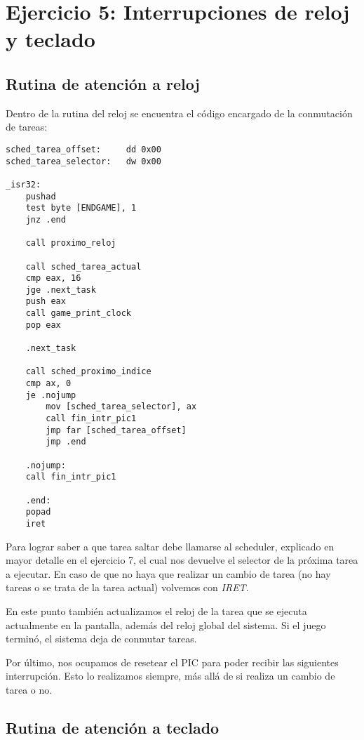 \section{Ejercicio 5: Interrupciones de reloj y teclado}

	\subsection{Rutina de atención a reloj}

	Dentro de la rutina del reloj se encuentra el código encargado de la conmutación de tareas:

    \lstset{escapechar=@,style=asm}
	\begin{lstlisting}
sched_tarea_offset:     dd 0x00
sched_tarea_selector:   dw 0x00

_isr32:
    pushad
    test byte [ENDGAME], 1
    jnz .end

    call proximo_reloj

    call sched_tarea_actual
    cmp eax, 16 
    jge .next_task
    push eax
    call game_print_clock
    pop eax

    .next_task

    call sched_proximo_indice
    cmp ax, 0
    je .nojump
        mov [sched_tarea_selector], ax
        call fin_intr_pic1
        jmp far [sched_tarea_offset]
        jmp .end

    .nojump:
    call fin_intr_pic1

    .end:
    popad
    iret
	\end{lstlisting}

	Para lograr saber a que tarea saltar debe llamarse al scheduler, explicado en mayor detalle en el ejercicio 7, el cual nos devuelve el selector de la próxima tarea a ejecutar. En caso de que no haya que realizar un cambio de tarea (no hay tareas o se trata de la tarea actual) volvemos con \textit{IRET}.

	En este punto también actualizamos el reloj de la tarea que se ejecuta actualmente en la pantalla, además del reloj global del sistema. Si el juego terminó, el sistema deja de conmutar tareas.

	Por último, nos ocupamos de resetear el PIC para poder recibir las siguientes interrupción. Esto lo realizamos siempre, más allá de si realiza un cambio de tarea o no.

	\subsection{Rutina de atención a teclado}

